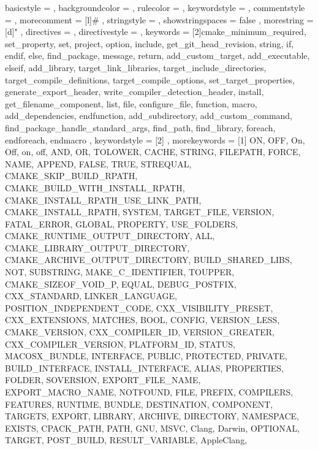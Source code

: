 {
    basicstyle       = 
    \ttfamily
    \lst@ifdisplaystyle\scriptsize\fi %
%
,   backgroundcolor  = \color{msvc_background}
,   rulecolor        = \color{msvc_frame}
,   keywordstyle     = \lst@ifdisplaystyle\color{msvc_keyword}\fi
,   commentstyle     = \lst@ifdisplaystyle\color{msvc_comment}\fi
,   morecomment      = [l]{\#}
,   stringstyle      = \lst@ifdisplaystyle\color{msvc_string}\fi
,   showstringspaces = false
,   morestring       = [d]{"}
,	directives       = {}
,	directivestyle   = \lst@ifdisplaystyle\color{msvc_directives}\fi
,	keywords         = [2]{cmake_minimum_required, set_property, set, project, option, include, get_git_head_revision,
						string, if, endif, else, find_package, message, return, add_custom_target, add_executable, elseif,
						add_library, target_link_libraries, target_include_directories, target_compile_definitions,
						target_compile_options, set_target_properties, generate_export_header, write_compiler_detection_header,
						install, get_filename_component, list, file, configure_file, function, macro, add_dependencies, endfunction,
						add_subdirectory, add_custom_command, find_package_handle_standard_args, find_path, find_library,
						foreach, endforeach, endmacro }
,	keywordstyle     = [2]\lst@ifdisplaystyle\color{msvc_stl}\fi
,   morekeywords     = [1]{ ON, OFF, On, Off, on, off, AND, OR, TOLOWER, CACHE, STRING, FILEPATH, FORCE, NAME, APPEND,
						FALSE, TRUE, STREQUAL, CMAKE_SKIP_BUILD_RPATH, CMAKE_BUILD_WITH_INSTALL_RPATH,
						CMAKE_INSTALL_RPATH_USE_LINK_PATH, CMAKE_INSTALL_RPATH, SYSTEM, TARGET_FILE,
						VERSION, FATAL_ERROR, GLOBAL, PROPERTY, USE_FOLDERS, CMAKE_RUNTIME_OUTPUT_DIRECTORY, ALL,
						CMAKE_LIBRARY_OUTPUT_DIRECTORY, CMAKE_ARCHIVE_OUTPUT_DIRECTORY, BUILD_SHARED_LIBS, NOT, SUBSTRING,
						MAKE_C_IDENTIFIER, TOUPPER, CMAKE_SIZEOF_VOID_P, EQUAL, DEBUG_POSTFIX, CXX_STANDARD, LINKER_LANGUAGE,
						POSITION_INDEPENDENT_CODE, CXX_VISIBILITY_PRESET, CXX_EXTENSIONS, MATCHES, BOOL, CONFIG,
						VERSION_LESS, CMAKE_VERSION, CXX_COMPILER_ID, VERSION_GREATER, CXX_COMPILER_VERSION,
						PLATFORM_ID, STATUS, MACOSX_BUNDLE, INTERFACE, PUBLIC, PROTECTED, PRIVATE, BUILD_INTERFACE,
						INSTALL_INTERFACE, ALIAS, PROPERTIES, FOLDER, SOVERSION, EXPORT_FILE_NAME, EXPORT_MACRO_NAME,
						NOTFOUND, FILE, PREFIX, COMPILERS, FEATURES, RUNTIME, BUNDLE, DESTINATION, COMPONENT,
						TARGETS, EXPORT, LIBRARY, ARCHIVE, DIRECTORY, NAMESPACE, EXISTS, CPACK_PATH, PATH, GNU, MSVC, Clang,
						Darwin, OPTIONAL, TARGET, POST_BUILD, RESULT_VARIABLE, AppleClang,
}}
